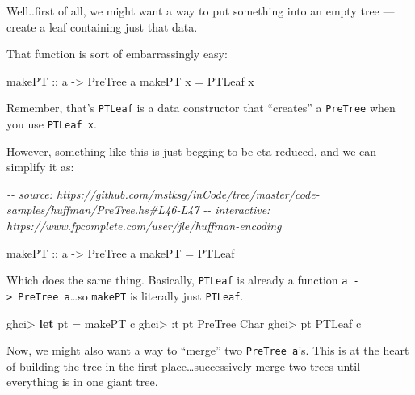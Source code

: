 \documentclass[]{article}
\newenvironment{Shaded}{}{}
\newcommand{\CharTok}[1]{\textcolor[rgb]{0.25,0.44,0.63}{#1}}
\newcommand{\CommentTok}[1]{\textcolor[rgb]{0.38,0.63,0.69}{\textit{#1}}}
\newcommand{\DataTypeTok}[1]{\textcolor[rgb]{0.56,0.13,0.00}{#1}}
\newcommand{\KeywordTok}[1]{\textcolor[rgb]{0.00,0.44,0.13}{\textbf{#1}}}
\newcommand{\NormalTok}[1]{#1}
\newcommand{\OperatorTok}[1]{\textcolor[rgb]{0.40,0.40,0.40}{#1}}
\newcommand{\OtherTok}[1]{\textcolor[rgb]{0.00,0.44,0.13}{#1}}
\begin{document}
Well..first of all, we might want a way to put something into an empty tree ---
create a leaf containing just that data.

That function is sort of embarrassingly easy:

\begin{Shaded}
\begin{Highlighting}[]
\OtherTok{makePT\textquotesingle{} ::}\NormalTok{ a }\OtherTok{{-}>} \DataTypeTok{PreTree}\NormalTok{ a}
\NormalTok{makePT\textquotesingle{} x }\OtherTok{=} \DataTypeTok{PTLeaf}\NormalTok{ x}
\end{Highlighting}
\end{Shaded}

Remember, that's \texttt{PTLeaf} is a data constructor that ``creates'' a
\texttt{PreTree} when you use \texttt{PTLeaf\ x}.

However, something like this is just begging to be eta-reduced, and we can
simplify it as:

\begin{Shaded}
\begin{Highlighting}[]
\CommentTok{{-}{-} source: https://github.com/mstksg/inCode/tree/master/code{-}samples/huffman/PreTree.hs\#L46{-}L47}
\CommentTok{{-}{-} interactive: https://www.fpcomplete.com/user/jle/huffman{-}encoding}

\OtherTok{makePT ::}\NormalTok{ a }\OtherTok{{-}>} \DataTypeTok{PreTree}\NormalTok{ a}
\NormalTok{makePT }\OtherTok{=} \DataTypeTok{PTLeaf}
\end{Highlighting}
\end{Shaded}

Which does the same thing. Basically, \texttt{PTLeaf} is already a function
\texttt{a\ -\textgreater{}\ PreTree\ a}\ldots so \texttt{makePT} is literally
just \texttt{PTLeaf}.

\begin{Shaded}
\begin{Highlighting}[]
\NormalTok{ghci}\OperatorTok{>} \KeywordTok{let}\NormalTok{ pt }\OtherTok{=}\NormalTok{ makePT }\CharTok{\textquotesingle{}c\textquotesingle{}}
\NormalTok{ghci}\OperatorTok{>} \OperatorTok{:}\NormalTok{t pt}
\DataTypeTok{PreTree} \DataTypeTok{Char}
\NormalTok{ghci}\OperatorTok{>}\NormalTok{ pt}
\DataTypeTok{PTLeaf} \CharTok{\textquotesingle{}c\textquotesingle{}}
\end{Highlighting}
\end{Shaded}

Now, we might also want a way to ``merge'' two \texttt{PreTree\ a}'s. This is at
the heart of building the tree in the first place\ldots successively merge two
trees until everything is in one giant tree.
\end{document}
